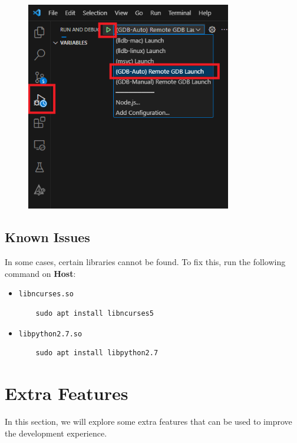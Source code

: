 \begin{figure}[H]
      \centering
      \includegraphics[width=0.8\textwidth]{texs/chapter1/image/debug.png}
\end{figure}

\subsection{Known Issues}

In some cases, certain libraries cannot be found. To fix this, run the following command on \textbf{Host}:

\begin{itemize}
      \item \texttt{libncurses.so}
            \begin{lstlisting}
    sudo apt install libncurses5
    \end{lstlisting}

      \item \texttt{libpython2.7.so}
            \begin{lstlisting}
    sudo apt install libpython2.7
    \end{lstlisting}
\end{itemize}

\section{Extra Features}

In this section, we will explore some extra features that can be used to improve the development experience.

